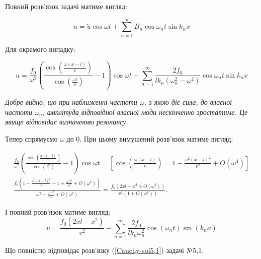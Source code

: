 Повний розв'язок задачі матиме вигляд:

\begin{equation}
    u = \tilde{u}\cos{\omega t} + \sum_{n=1}^\infty B_n\cos\omega_nt\sin k_nx
\end{equation}

Для окремого випадку:

\begin{equation} 
    u = \frac{f_0}{\omega^2} \left(\frac{\cos\left(\frac{\omega (x-l)}{v}\right)}{\cos\left(\frac{\omega l}{v}\right)}-1\right) \cos{\omega t} - \sum_{n=1}^\infty \frac{2f_0}{lk_n\left(\omega_n^2-\omega^2\right)} \cos\omega_nt\sin k_nx
\end{equation}

\textit{Добре видно, що при наближенні частоти $\omega$, з якою діє сила, до власної частоти $\omega_n$, амплітуда відповідної власної моди нескінченно зростатиме. Це явище відповідає визначенню резонансу.}

Тепер спрямуємо $\omega$ до 0. При цьому вимушений розв'язок матиме вигляд:

\begin{equation*}
    \begin{aligned}
        &\frac {f_0}{\omega^2}\left(\frac{\cos\left(\frac{\omega (x-l)}{v}\right)}{\cos\left(\frac{\omega l}{v}\right)}-1\right)\cos{\omega t}=\left[ \cos\left(\frac{\omega (x-l)}{v}\right)=1-\frac{\omega^2 (x-l)^2}{v^2}+O(\omega^4)\right]=\\
        &\frac {f_0\left(1-\frac{\omega^2 (x-l)^2}{v^2}-1+\frac{\omega^2 l^2}{v^2}+O(\omega^4)\right)}{\omega^2-\frac{\omega^4 l^2}{v^2}+O(\omega^6)}=\frac {f_0\left( 2xl-x^2+O(\omega^2)\right)}{v^2(1+O(\omega^2))}.
    \end{aligned}
\end{equation*}

І повний розв'язок матиме вигляд:
\begin{equation} 
    u = \frac{f_0\left( 2xl-x^2\right)}{v^2} - \sum_{n=1}^\infty \frac{2f_0}{lk_n\omega_n^2}\cos(\omega_n t)\sin(k_n x)
\end{equation}

Що повністю відповідає розв'язку (\ref{Cauchy-sol5,1}) задачі  №5,1.

%